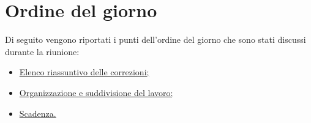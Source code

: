 \clearpage
\section{Ordine del giorno}
Di seguito vengono riportati i punti dell’ordine del giorno che sono stati discussi durante la riunione:
\begin{itemize}
	\item \hyperref[sec:elenco_riassunto]{Elenco riassuntivo delle correzioni;}
	\item \hyperref[sec:oganizzazione_lavoro]{Organizzazione e suddivisione del lavoro;}
	\item \hyperref[sec:scadenza]{Scadenza.}
\end{itemize}